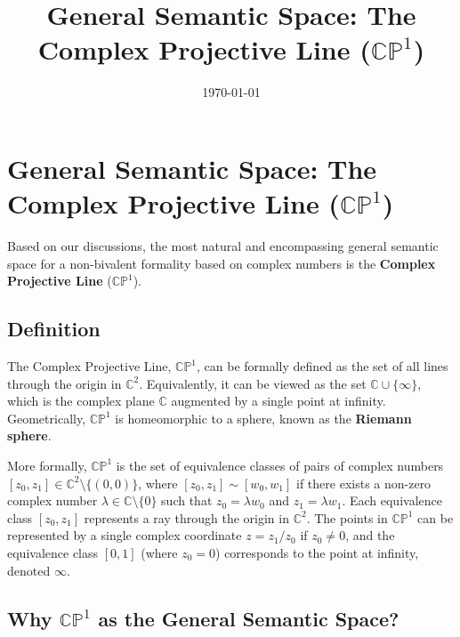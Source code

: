 \documentclass{article}
\title{General Semantic Space: The Complex Projective Line ($\mathbb{CP}^1$)}
\author{}
\date{\today}
\begin{document}
	\maketitle

	\section{General Semantic Space: The Complex Projective Line ($\mathbb{CP}^1$)}
	
	Based on our discussions, the most natural and encompassing general semantic space for a non-bivalent formality based on complex numbers is the \textbf{Complex Projective Line} ($\mathbb{CP}^1$).
	
	\subsection{Definition}
	
	The Complex Projective Line, $\mathbb{CP}^1$, can be formally defined as the set of all lines through the origin in $\mathbb{C}^2$. Equivalently, it can be viewed as the set $\mathbb{C} \cup \{\infty\}$, which is the complex plane $\mathbb{C}$ augmented by a single point at infinity. Geometrically, $\mathbb{CP}^1$ is homeomorphic to a sphere, known as the \textbf{Riemann sphere}.
	
	More formally, $\mathbb{CP}^1$ is the set of equivalence classes of pairs of complex numbers $[z_0, z_1] \in \mathbb{C}^2 \setminus \{(0,0)\}$, where $[z_0, z_1] \sim [w_0, w_1]$ if there exists a non-zero complex number $\lambda \in \mathbb{C} \setminus \{0\}$ such that $z_0 = \lambda w_0$ and $z_1 = \lambda w_1$. Each equivalence class $[z_0, z_1]$ represents a ray through the origin in $\mathbb{C}^2$. The points in $\mathbb{CP}^1$ can be represented by a single complex coordinate $z = z_1/z_0$ if $z_0 \neq 0$, and the equivalence class $[0, 1]$ (where $z_0 = 0$) corresponds to the point at infinity, denoted $\infty$.
	
	\subsection{Why $\mathbb{CP}^1$ as the General Semantic Space?}
	
\end{document}

